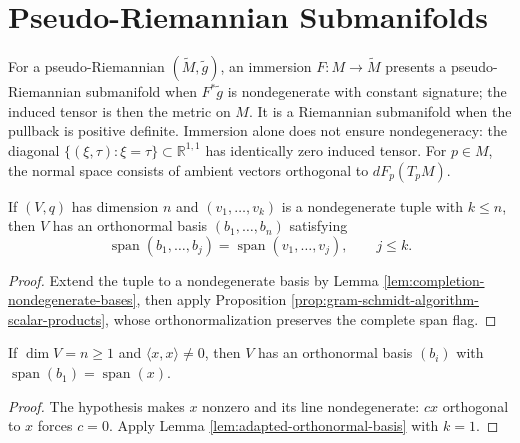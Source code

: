 \section{Pseudo-Riemannian Submanifolds}

For a pseudo-Riemannian $(\widetilde M,\widetilde g)$, an immersion $F:M\to\widetilde M$ presents a pseudo-Riemannian submanifold when $F^*\widetilde g$ is nondegenerate with constant signature; the induced tensor is then the metric on $M$. It is a Riemannian submanifold when the pullback is positive definite. Immersion alone does not ensure nondegeneracy: the diagonal $\{(\xi,\tau):\xi=\tau\}\subset\mathbb R^{1,1}$ has identically zero induced tensor. For $p\in M$, the normal space consists of ambient vectors orthogonal to $dF_p(T_pM)$.

\begin{lemma}
\label{lem:adapted-orthonormal-basis}





If $(V,q)$ has dimension $n$ and $(v_1,\ldots,v_k)$ is a nondegenerate tuple with $k\le n$, then $V$ has an orthonormal basis $(b_1,\ldots,b_n)$ satisfying
\[
\operatorname{span}(b_1,\ldots,b_j)=\operatorname{span}(v_1,\ldots,v_j),\qquad j\le k.
\]
\end{lemma}
\begin{proof}

\sketch Extend the tuple to a nondegenerate basis by Lemma \ref{lem:completion-nondegenerate-bases}, then apply Proposition \ref{prop:gram-schmidt-algorithm-scalar-products}, whose orthonormalization preserves the complete span flag.
\end{proof}

\begin{lemma}
\label{lem:adapted-orthonormal-basis-line}





If $\dim V=n\ge1$ and $\langle x,x\rangle\ne0$, then $V$ has an orthonormal basis $(b_i)$ with $\operatorname{span}(b_1)=\operatorname{span}(x)$.
\end{lemma}
\begin{proof}

\sketch The hypothesis makes $x$ nonzero and its line nondegenerate: $cx$ orthogonal to $x$ forces $c=0$. Apply Lemma \ref{lem:adapted-orthonormal-basis} with $k=1$.
\end{proof}

